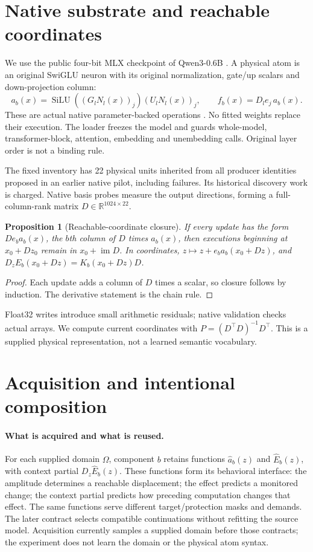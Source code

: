 \documentclass[11pt]{article}
\newtheorem{proposition}{Proposition}
\newcommand{\R}{\mathbb{R}}
\newcommand{\silu}{\operatorname{SiLU}}
\begin{document}
\section{Native substrate and reachable coordinates}
We use the public four-bit MLX checkpoint of Qwen3-0.6B
\citep{qwen3,checkpoint,mlx}. A physical atom is an original SwiGLU neuron with
its original normalization, gate/up scalars and down-projection column:
\[
 a_b(x)=\silu((G_lN_l(x))_j)(U_lN_l(x))_j,\qquad
 f_b(x)=D_le_j\,a_b(x).
\]
These are actual native parameter-backed operations
\citep{rmsnorm,swiglu}. No fitted weights replace their execution. The loader
freezes the model and guards whole-model, transformer-block, attention,
embedding and unembedding calls. Original layer order is not a binding rule.

The fixed inventory has 22 physical units inherited from all producer
identities proposed in an earlier native pilot, including failures. Its
historical discovery work is charged. Native basis probes measure the output
directions, forming a full-column-rank matrix $D\in\R^{1024\times22}$.

\begin{proposition}[Reachable-coordinate closure]
If every update has the form $D e_b a_b(x)$, the
$b$th column of $D$ times $a_b(x)$, then executions beginning at
$x_0+Dz_0$ remain in $x_0+\operatorname{im}D$. In coordinates,
$z\mapsto z+e_ba_b(x_0+Dz)$, and
$D_zE_b(x_0+Dz)=K_b(x_0+Dz)D$.
\end{proposition}
\begin{proof}
Each update adds a column of $D$ times a scalar, so closure follows by
induction. The derivative statement is the chain rule.
\end{proof}
Float32 writes introduce small arithmetic residuals; native validation
checks actual arrays. We compute current coordinates with
$P=(D^\top D)^{-1}D^\top$. This is a supplied physical representation, not a
learned semantic vocabulary.

\section{Acquisition and intentional composition}
\paragraph{What is acquired and what is reused.}
For each supplied domain $\Omega$, component $b$ retains functions
$\widehat a_b(z)$ and $\widehat E_b(z)$, with context partial
$D_z\widehat E_b(z)$. These functions form its behavioral interface: the
amplitude determines a reachable displacement; the effect predicts a monitored
change; the context partial predicts how preceding computation changes that
effect. The same functions serve different target/protection masks and demands.
The later contract selects compatible continuations without refitting the
source model. Acquisition currently samples a supplied domain before those
contracts; the experiment does not learn the domain or the physical atom syntax.
\end{document}
